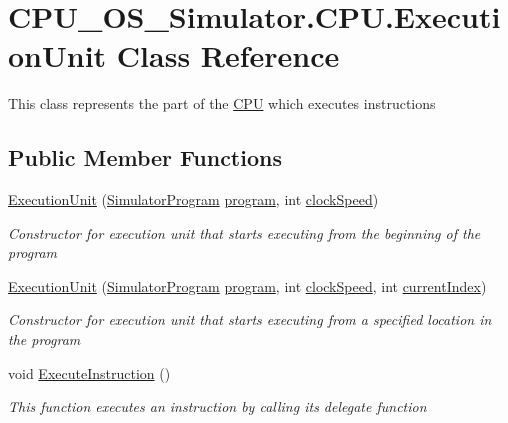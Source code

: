 \hypertarget{class_c_p_u___o_s___simulator_1_1_c_p_u_1_1_execution_unit}{}\section{C\+P\+U\+\_\+\+O\+S\+\_\+\+Simulator.\+C\+P\+U.\+Execution\+Unit Class Reference}
\label{class_c_p_u___o_s___simulator_1_1_c_p_u_1_1_execution_unit}


This class represents the part of the \hyperlink{namespace_c_p_u___o_s___simulator_1_1_c_p_u}{C\+P\+U} which executes instructions  


\subsection*{Public Member Functions}
\begin{DoxyCompactItemize}
\item 
\hyperlink{class_c_p_u___o_s___simulator_1_1_c_p_u_1_1_execution_unit_aaa72bccee27d810d5bbfa9ed02215fa9}{Execution\+Unit} (\hyperlink{class_c_p_u___o_s___simulator_1_1_c_p_u_1_1_simulator_program}{Simulator\+Program} \hyperlink{class_c_p_u___o_s___simulator_1_1_c_p_u_1_1_execution_unit_a192670bee8ca089c38e9989350f658d6}{program}, int \hyperlink{class_c_p_u___o_s___simulator_1_1_c_p_u_1_1_execution_unit_a0deb0a3e0c9fa402598bbf18be6535cc}{clock\+Speed})
\begin{DoxyCompactList}\small\item\em Constructor for execution unit that starts executing from the beginning of the program \end{DoxyCompactList}\item 
\hyperlink{class_c_p_u___o_s___simulator_1_1_c_p_u_1_1_execution_unit_a0b69abfef40692e266fee90b2321797e}{Execution\+Unit} (\hyperlink{class_c_p_u___o_s___simulator_1_1_c_p_u_1_1_simulator_program}{Simulator\+Program} \hyperlink{class_c_p_u___o_s___simulator_1_1_c_p_u_1_1_execution_unit_a192670bee8ca089c38e9989350f658d6}{program}, int \hyperlink{class_c_p_u___o_s___simulator_1_1_c_p_u_1_1_execution_unit_a0deb0a3e0c9fa402598bbf18be6535cc}{clock\+Speed}, int \hyperlink{class_c_p_u___o_s___simulator_1_1_c_p_u_1_1_execution_unit_af6807cb5343acc2c40a08166c748f1f0}{current\+Index})
\begin{DoxyCompactList}\small\item\em Constructor for execution unit that starts executing from a specified location in the program \end{DoxyCompactList}\item 
void \hyperlink{class_c_p_u___o_s___simulator_1_1_c_p_u_1_1_execution_unit_ae0298423e5e7aad47e342e3960a361ac}{Execute\+Instruction} ()
\begin{DoxyCompactList}\small\item\em This function executes an instruction by calling its delegate function \end{DoxyCompactList}\end{DoxyCompactItemize}
